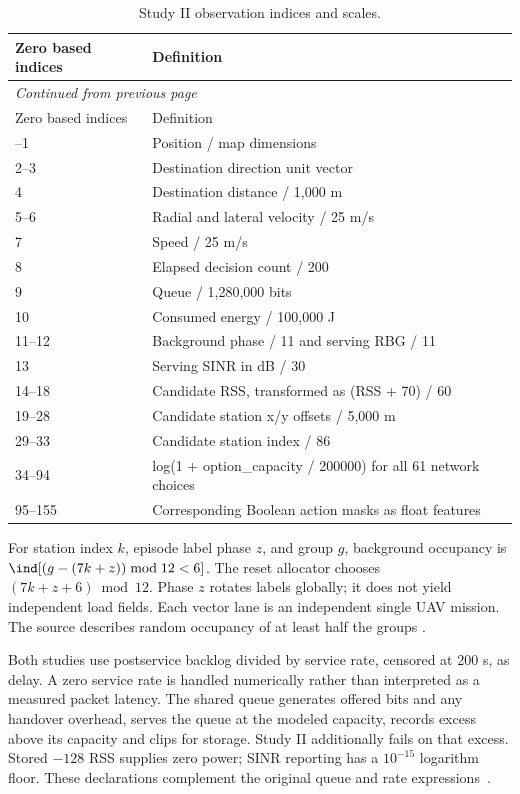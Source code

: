 {\footnotesize\setlength{\tabcolsep}{3pt}
\begin{longtable}{@{}p{}p{}@{}}
\caption{Study II observation indices and scales.}\label{tab:obs2}\\
\toprule Zero based indices & Definition\\\midrule
\endfirsthead
\multicolumn{2}{l}{\textit{Continued from previous page}}\\\toprule
Zero based indices & Definition\\\midrule
\endhead
\bottomrule\endfoot
0--1 & Position / map dimensions\\
2--3 & Destination direction unit vector\\
4 & Destination distance / 1,000 m\\
5--6 & Radial and lateral velocity / 25 m/s\\
7 & Speed / 25 m/s\\
8 & Elapsed decision count / 200\\
9 & Queue / 1,280,000 bits\\
10 & Consumed energy / 100,000 J\\
11--12 & Background phase / 11 and serving RBG / 11\\
13 & Serving SINR in dB / 30\\
14--18 & Candidate RSS, transformed as (RSS + 70) / 60\\
19--28 & Candidate station x/y offsets / 5,000 m\\
29--33 & Candidate station index / 86\\
34--94 & log(1 + option\_capacity / 200000) for all 61 network choices\\
95--155 & Corresponding Boolean action masks as float features\\
\end{longtable}}

For station index $k$, episode label phase $z$, and group $g$, background
occupancy is $\ind[(g-(7k+z))\bmod12<6]$. The reset allocator chooses
$(7k+z+6)\bmod12$. Phase $z$ rotates labels globally; it does not yield independent
load fields. Each vector lane is an independent single UAV mission. The source
describes random occupancy of at least half the groups
\cite[p.~14, Sec.~6.1; p.~15, Table~3]{thesis}.

Both studies use postservice backlog divided by service rate, censored at 200 s,
as delay. A zero service rate is handled numerically rather than interpreted
as a measured packet latency. The shared queue generates offered bits and any
handover overhead, serves the queue at the modeled capacity, records excess
above its capacity and clips for storage. Study II additionally fails on that
excess. Stored $-128$ RSS supplies zero power; SINR reporting has a $10^{-15}$
logarithm floor. These declarations complement the original queue and rate
expressions~\cite[pp.~9--10, Eqs.~(4)--(9)]{thesis}.

